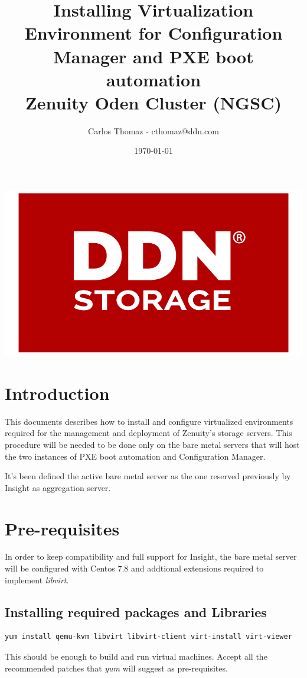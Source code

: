 \documentclass{article}
\title{%
Installing Virtualization Environment for Configuration Manager and PXE boot automation \\
\large Zenuity Oden Cluster (NGSC)}
\author{Carlos Thomaz - cthomaz@ddn.com}
\date{\today}
\begin{document}
\maketitle


\begin{center}
    \includegraphics[scale=0.14]{logo.png}\\[1cm] 
\end{center}

\newpage

\begin{versionhistory}

\end{versionhistory}
\newpage


\section{Introduction}
This documents describes how to install and configure virtualized environments required for the management and deployment of Zenuity's storage servers. This procedure will be needed to be done only on the bare metal servers that will host the two instances of PXE boot automation and Configuration Manager. 

It's been defined the active bare metal server as the one reserved previously by Insight as aggregation server. 

\section{Pre-requisites}
In order to keep compatibility and full support for Insight, the bare metal server will be configured with Centos 7.8 and addtional extensions required to implement \textit{libvirt}.

\subsection{Installing required packages and Libraries}
\begin{Verbatim}[frame=single]
    yum install qemu-kvm libvirt libvirt-client virt-install virt-viewer
\end{Verbatim}
This should be enough to build and run virtual machines. Accept all the recommended patches that \textit{yum} will suggest as pre-requisites.
\end{document}
